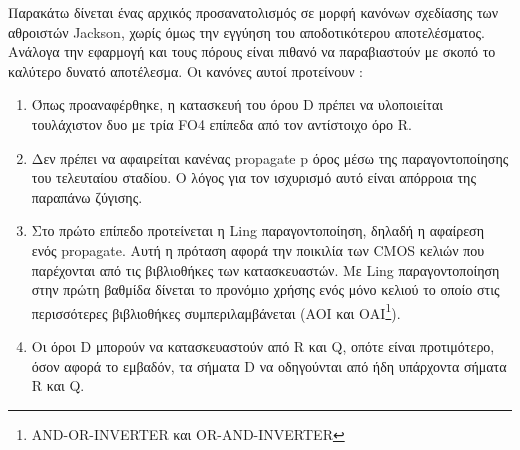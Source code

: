 Παρακάτω δίνεται ένας αρχικός προσανατολισμός σε μορφή κανόνων  σχεδίασης των 
αθροιστών Jackson, χωρίς όμως την εγγύηση του αποδοτικότερου αποτελέσματος. 
Ανάλογα την εφαρμογή και τους πόρους είναι πιθανό να παραβιαστούν με σκοπό το καλύτερο 
δυνατό αποτέλεσμα. Οι κανόνες αυτοί προτείνουν :
\begin{enumerate}
    \item Όπως προαναφέρθηκε, η κατασκευή του όρου D πρέπει να υλοποιείται τουλάχιστον δυο με τρία FO4 επίπεδα από τον αντίστοιχο όρο R.
    \item Δεν πρέπει να αφαιρείται κανένας propagate p όρος μέσω της παραγοντοποίησης του τελευταίου
    σταδίου. Ο λόγος για τον ισχυρισμό αυτό είναι απόρροια της παραπάνω ζύγισης.
    \item Στο πρώτο επίπεδο προτείνεται η Ling παραγοντοποίηση, δηλαδή η αφαίρεση ενός 
    propagate. Αυτή η πρόταση αφορά την ποικιλία των CMOS κελιών που
    παρέχονται από τις βιβλιοθήκες των κατασκευαστών. Με Ling παραγοντοποίηση στην πρώτη 
    βαθμίδα δίνεται το προνόμιο χρήσης ενός μόνο κελιού το οποίο στις περισσότερες βιβλιοθήκες
    συμπεριλαμβάνεται (AOI και ΟΑΙ\footnote{AND-OR-INVERTER και OR-AND-INVERTER}).
    \item Οι όροι D μπορούν να κατασκευαστούν από R και Q, οπότε είναι προτιμότερο, όσον αφορά
    το εμβαδόν, τα σήματα D να οδηγούνται από ήδη υπάρχοντα σήματα R και Q.
\end{enumerate}


































